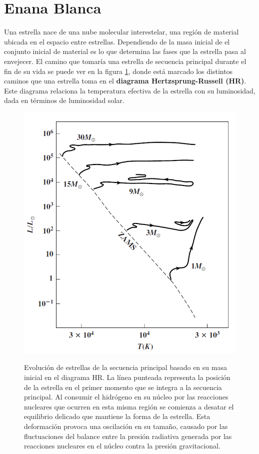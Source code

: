 \section{Enana Blanca}\label{intro:sec:EnanaBlanca}

Una estrella nace de una nube molecular interestelar, una región de material
ubicada en el espacio entre estrellas. Dependiendo de la masa inicial de el
conjunto inicial de material es lo que determina las fases que la estrella pasa
al envejecer. El camino que tomaría una estrella de secuencia principal durante
el fin de su vida se puede ver en la figura \ref{evolucionMSEstrella}, donde
está marcado los distintos caminos que una estrella toma en el \textbf{diagrama
Hertzsprung-Russell (HR)}. Este diagrama relaciona la temperatura efectiva de la
estrella con su luminosidad, dada en términos de luminosidad solar.

\begin{figure}[!ht]
	\centering
	\includegraphics[scale=0.5]{Introduccion/Figures/Figura Evolucion_MS_Astronomy_Physical_Perspective.png}
	\caption{Evolución de estrellas de la secuencia principal basado en su masa
	inicial en el diagrama HR. La línea punteada representa la posición de la
	estrella en el primer momento que se integra a la secuencia principal. Al
	consumir el hidrógeno en su núcleo por las reacciones nucleares que ocurren
	en esta misma región se comienza a desatar el equilibrio delicado que
	mantiene la forma de la estrella. Esta deformación provoca una oscilación en
	su tamaño, causado por las fluctuaciones del balance entre la presión
	radiativa generada por las reacciones nucleares en el núcleo contra la
	presión gravitacional.}
	\citet{astronomyPhysicalPerspective_stellarOldAgeChapter}
	\label{evolucionMSEstrella}
\end{figure}

